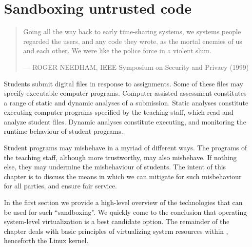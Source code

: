 
\chapter{Sandboxing untrusted code}

\begin{quotation}

\footnotesize\sffamily\itshape

\begin{flushright}

Going all the way back to early time-sharing systems, we systems people
regarded the users, and any code they wrote, as the mortal enemies of us and
each other. We were like the police force in a violent slum.

\smallbreak

\upshape

--- ROGER NEEDHAM, IEEE Symposium on Security and Privacy (1999)

\end{flushright}

\end{quotation}

Students submit digital files in response to assignments. Some of these files
may specify executable computer programs. Computer-assisted assessment
constitutes a range of static and dynamic analyses of a submission. Static
analyses constitute executing computer programs specified by the teaching
staff, which read and analyze student files. Dynamic analyses constitute
executing, and monitoring the runtime behaviour of student programs.

Student programs may misbehave in a myriad of different ways. The programs of
the teaching staff, although more trustworthy, may also misbehave. If nothing
else, they may undermine the misbehaviour of students. The intent of this
chapter is to discuss the means in which we can mitigate for such misbehaviour
for all parties, and ensure fair service.

In the first section we provide a high-level overview of the technologies that
can be used for such ``sandboxing''. We quickly come to the conclusion that
operating system-level virtualization is a best candidate option. The remainder
of the chapter deals with basic principles of virtualizing system resources
within \cite{linux-kernel-v3.14.2}, henceforth the Linux kernel.













